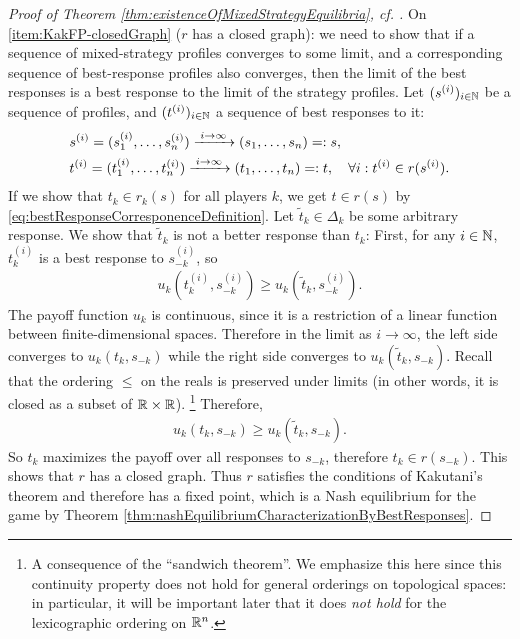 \documentclass[a4paper]{scrreprt}
\theoremstyle{definition}
\begin{document}
\begin{proof}[Proof of Theorem \ref{thm:existenceOfMixedStrategyEquilibria}, cf. {\cite[p.29]{bib:fudenbergGameTheory}}]
        On \ref{item:KakFP-closedGraph} ($r$ has a closed graph): we need to show that if a sequence of mixed-strategy profiles converges to some limit, and a corresponding sequence of best-response profiles also converges, then the limit of the best responses is a best response to the limit of the strategy profiles. Let $(s^{(i)})_{i \in \mathbb{N}}$ be a sequence of profiles, and $(t^{(i)})_{i \in \mathbb{N}}$ a sequence of best responses to it:
        \begin{align*}
            &s^{(i)} = (s_1^{(i)}, \dots, s_n^{(i)}) \xrightarrow{\;i \to \infty\;} (s_1, \dots, s_n) =: s, \\
            &t^{(i)} = (t_1^{(i)}, \dots, t_n^{(i)}) \xrightarrow{\;i \to \infty\;} (t_1, \dots, t_n) =: t, \quad
            \forall i: t^{(i)} \in r(s^{(i)}).
        \end{align*}
        If we show that $t_k \in r_k(s)$ for all players $k$, we get $t \in r(s)$ by \eqref{eq:bestResponseCorresponenceDefinition}.
        Let 
        $\tilde{t}_k \in \Delta_k$ be some arbitrary response. We show that $\tilde{t}_k$ is not a better response than $t_k$:
        First, for any $i \in \mathbb{N}$, $t^{(i)}_k$ is a best response to $s^{(i)}_{-k}$, so
        \begin{gather*}
            u_k(t^{(i)}_k, s^{(i)}_{-k}) \geq u_k(\tilde{t}_k, s^{(i)}_{-k}).
        \end{gather*}
        The payoff function $u_k$ is continuous, since it is a restriction of a linear function between finite-dimensional spaces. Therefore in the limit as $i \to \infty$, the left side converges to $u_k(t_k, s_{-k})$ while the right side converges to $u_k(\tilde{t}_k, s_{-k})$.
        Recall that the ordering $\leq$ on the reals is preserved under limits (in other words, it is closed as a subset of $\mathbb{R} \times \mathbb{R}$).
        \footnote{A consequence of the “sandwich theorem”. We emphasize this here since this continuity property does not hold for general orderings on topological spaces:
        in particular, it will be important later that it does \emph{not hold} for the lexicographic ordering on $\mathbb{R}^n$.}
        Therefore,
        \begin{gather*}
            u_k(t_k, s_{-k}) \geq u_k(\tilde{t}_k, s_{-k}).
        \end{gather*}
        So $t_k$ maximizes the payoff over all responses to $s_{-k}$, therefore $t_k \in r(s_{-k})$. This shows that $r$ has a closed graph.
        Thus $r$ satisfies the conditions of Kakutani's theorem and therefore has a fixed point, which is a Nash equilibrium for the game by Theorem \ref{thm:nashEquilibriumCharacterizationByBestResponses}.
    \end{proof}
    
\end{document}
